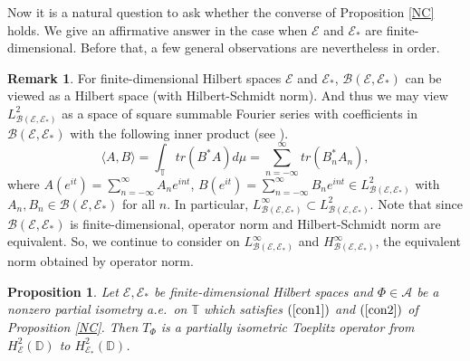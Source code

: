\documentclass[12pt]{amsart}
\newcommand{\cla}{\mathcal{A}}
\newcommand{\clb}{\mathcal{B}}
\newcommand{\cle}{\mathcal{E}}
\newcommand{\D}{\mathbb{D}}
\newcommand{\T}{\mathbb{T}}
\theoremstyle{definition}
\theoremstyle{plain}
\newtheorem{prop}[thm]{Proposition}
\theoremstyle{definition}
\newtheorem{rem}[thm]{Remark}
\numberwithin{equation}{section}
\begin{document}
Now it is a natural question to ask whether the converse of Proposition \ref{NC} holds. We give an affirmative answer in the case when $\cle$ and $\cle_*$ are finite-dimensional. Before that, a few general observations are nevertheless in order.
\begin{rem}\label{innerproduct}
For finite-dimensional Hilbert spaces $\cle$ and  $\cle_*$, $\clb(\cle,\cle_*)$ can be viewed as a Hilbert space (with Hilbert-Schmidt norm). And thus we may view $L^2_{\clb(\cle,\cle_*)}$ as a space of square summable Fourier series with coefficients in $\clb(\cle,\cle_*)$ with the following inner product (see \cite{GHKL}).
\[
\langle A, B\rangle=\int_{\T} tr(B^*A) d\mu=\sum\limits_{n=-\infty}^\infty tr(B_n^*A_n),
\]
where $A(e^{it})=\sum\limits_{n=-\infty}^\infty A_ne^{int}$, $B(e^{it})=\sum\limits_{n=-\infty}^\infty B_ne^{int} \in L^2_{\clb(\cle,\cle_*)}$ with $A_n, B_n \in \clb(\cle,\cle_*)$ for all $n$. In particular, $L^\infty_{\clb(\cle,\cle_*)} \subset L^2_{\clb(\cle,\cle_*)}.$ Note that since $\clb(\cle,\cle_*)$ is finite-dimensional, operator norm and Hilbert-Schmidt norm are equivalent. So, we continue to consider on $L^\infty _{\clb(\cle,\cle_*)}$ and $H^\infty_{\clb(\cle,\cle_*)}$, the equivalent norm obtained by operator norm.
\end{rem}


\begin{prop}\label{SC}
Let $\cle,\cle_*$ be finite-dimensional Hilbert spaces and  $\Phi\in \cla$ be a nonzero partial isometry a.e.\ on $\T$ which satisfies $(\ref{con1})$ and $(\ref{con2})$ of Proposition \ref{NC}. Then $T_\Phi$ is a partially isometric Toeplitz operator from $H^2_\cle(\D)$ to $ H^2_{\cle_*}(\D)$.
\end{prop}
\end{document}
